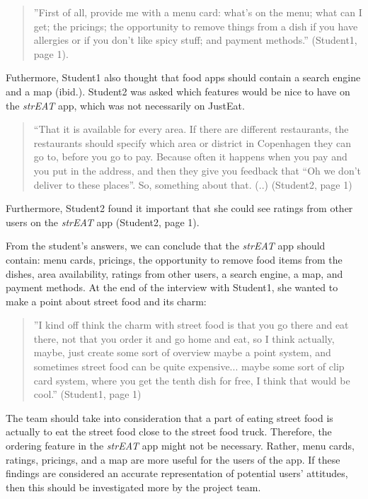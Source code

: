 \begin{quotation}
  ”First of all, provide me with a menu card: what’s on the menu; what can I get; the pricings; the opportunity to remove things from a dish if you have allergies or if you don’t like spicy stuff; and payment methods.” (Student1, page 1).
\end{quotation}

Futhermore, Student1 also thought that food apps should contain a search engine and a map (ibid.). Student2 was asked which features would be nice to have on the \textit{strEAT} app, which was not necessarily on JustEat.


\begin{quotation}
  “That it is available for every area. If there are different restaurants, the restaurants should specify which area or district in Copenhagen they can go to, before you go to pay. Because often it happens when you pay and you put in the address, and then they give you feedback that “Oh we don’t deliver to these places”. So, something about that. (..) (Student2, page 1)
\end{quotation}

Furthermore, Student2 found it important that she could see ratings from other users on the \textit{strEAT} app (Student2, page 1).

From the student’s answers, we can conclude that the \textit{strEAT} app should contain: menu cards, pricings, the opportunity to remove food items from the dishes, area availability, ratings from other users, a search engine, a map, and payment methods. At the end of the interview with Student1, she wanted to make a point about street food and its charm:

\begin{quotation}
”I kind off think the charm with street food is that you go there and eat there, not that you order it and go home and eat, so I think actually, maybe, just create some sort of overview maybe a point system, and sometimes street food can be quite expensive... maybe some sort of clip card system, where you get the tenth dish for free, I think that would be cool.” (Student1, page 1)
\end{quotation}


The team should take into consideration that a part of eating street food is actually to eat the street food close to the street food truck. Therefore, the ordering feature in the \textit{strEAT} app might not be necessary. Rather, menu cards, ratings, pricings, and a map are more useful for the users of the app. If these findings are considered an accurate representation of potential users' attitudes, then this should be investigated more by the project team.

